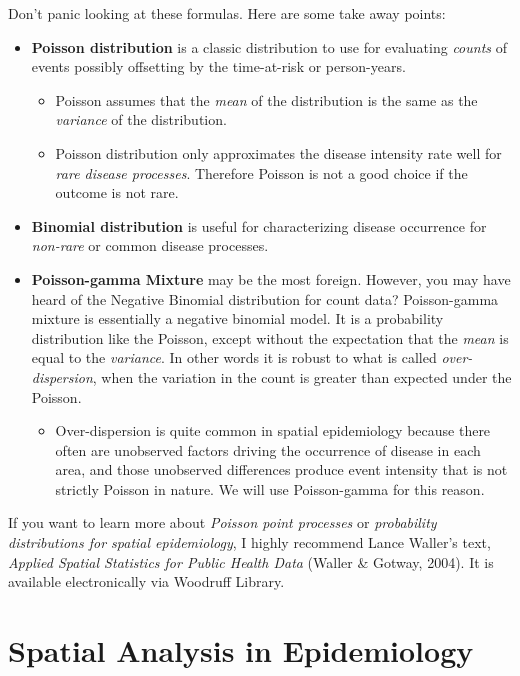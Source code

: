 \documentclass[
]{book}
\providecommand{\tightlist}{%
  \setlength{\itemsep}{0pt}\setlength{\parskip}{0pt}}
\begin{document}
Don't panic looking at these formulas. Here are some take away points:

\begin{itemize}
\tightlist
\item
  \textbf{Poisson distribution} is a classic distribution to use for evaluating \emph{counts} of events possibly offsetting by the time-at-risk or person-years.

  \begin{itemize}
  \tightlist
  \item
    Poisson assumes that the \emph{mean} of the distribution is the same as the \emph{variance} of the distribution.
  \item
    Poisson distribution only approximates the disease intensity rate well for \emph{rare disease processes}. Therefore Poisson is not a good choice if the outcome is not rare.
  \end{itemize}
\item
  \textbf{Binomial distribution} is useful for characterizing disease occurrence for \emph{non-rare} or common disease processes.
\item
  \textbf{Poisson-gamma Mixture} may be the most foreign. However, you may have heard of the Negative Binomial distribution for count data? Poisson-gamma mixture is essentially a negative binomial model. It is a probability distribution like the Poisson, except without the expectation that the \emph{mean} is equal to the \emph{variance}. In other words it is robust to what is called \emph{over-dispersion}, when the variation in the count is greater than expected under the Poisson.

  \begin{itemize}
  \tightlist
  \item
    Over-dispersion is quite common in spatial epidemiology because there often are unobserved factors driving the occurrence of disease in each area, and those unobserved differences produce event intensity that is not strictly Poisson in nature. We will use Poisson-gamma for this reason.
  \end{itemize}
\end{itemize}

If you want to learn more about \emph{Poisson point processes} or \emph{probability distributions for spatial epidemiology}, I highly recommend Lance Waller's text, \emph{Applied Spatial Statistics for Public Health Data} (Waller \& Gotway, 2004). It is available electronically via Woodruff Library.

\hypertarget{spatial-analysis-in-epidemiology-2}{%
\section{Spatial Analysis in Epidemiology}\label{spatial-analysis-in-epidemiology-2}}
\end{document}
